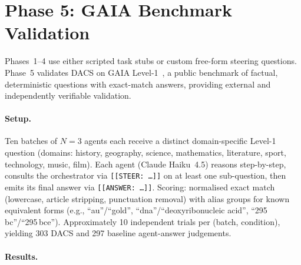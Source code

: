 \documentclass{article}
\begin{document}
\section{Phase 5: GAIA Benchmark Validation}
\label{sec:phase5}

Phases~1--4 use either scripted task stubs or custom free-form steering
questions.
Phase~5 validates DACS on GAIA Level-1~\citep{gaia2023}, a public
benchmark of factual, deterministic questions with exact-match answers,
providing external and independently verifiable validation.

\paragraph{Setup.}
Ten batches of $N{=}3$ agents each receive a distinct domain-specific
Level-1 question (domains: history, geography, science, mathematics,
literature, sport, technology, music, film).
Each agent (Claude Haiku~4.5) reasons step-by-step, consults the
orchestrator via \texttt{[[STEER:\,\ldots]]} on at least one sub-question,
then emits its final answer via \texttt{[[ANSWER:\,\ldots]]}.
Scoring: normalised exact match (lowercase, article stripping,
punctuation removal) with alias groups for known equivalent forms
(e.g., ``au''/``gold'', ``dna''/``deoxyribonucleic acid'',
``295\,bc''/``295\,bce'').
Approximately 10 independent trials per (batch, condition),
yielding 303 DACS and 297 baseline agent-answer judgements.

\paragraph{Results.}
\end{document}
